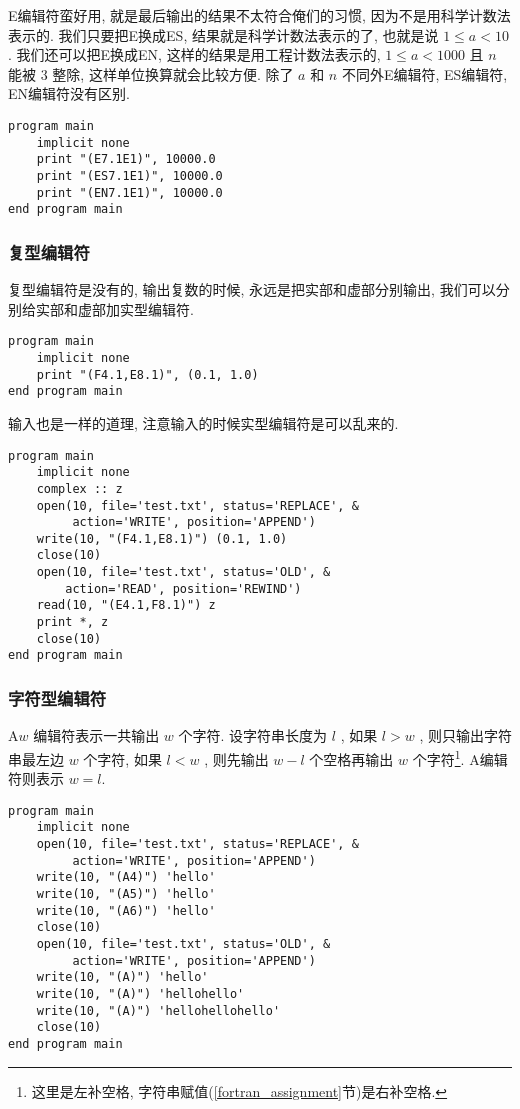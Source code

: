 E编辑符蛮好用, 就是最后输出的结果不太符合俺们的习惯, 因为不是用科学计数法表示的. 我们只要把E换成ES, 结果就是科学计数法表示的了, 也就是说 $ 1\leqslant a<10 $. 我们还可以把E换成EN, 这样的结果是用工程计数法表示的, $ 1\leqslant a<1000 $ 且 $ n $ 能被 $ 3 $ 整除, 这样单位换算就会比较方便. 除了 $ a $ 和 $ n $ 不同外E编辑符, ES编辑符, EN编辑符没有区别. 
\begin{lstlisting}
program main
    implicit none
    print "(E7.1E1)", 10000.0
    print "(ES7.1E1)", 10000.0
    print "(EN7.1E1)", 10000.0
end program main
\end{lstlisting}

\subsubsection{复型编辑符}

复型编辑符是没有的, 输出复数的时候, 永远是把实部和虚部分别输出, 我们可以分别给实部和虚部加实型编辑符. 
\begin{lstlisting}
program main
    implicit none
    print "(F4.1,E8.1)", (0.1, 1.0)
end program main
\end{lstlisting}
输入也是一样的道理, 注意输入的时候实型编辑符是可以乱来的. 
\begin{lstlisting}
program main
    implicit none
    complex :: z
    open(10, file='test.txt', status='REPLACE', &
         action='WRITE', position='APPEND')
    write(10, "(F4.1,E8.1)") (0.1, 1.0)
    close(10)
    open(10, file='test.txt', status='OLD', &
        action='READ', position='REWIND')
    read(10, "(E4.1,F8.1)") z
    print *, z
    close(10)
end program main
\end{lstlisting}

\subsubsection{字符型编辑符}

A$ w $ 编辑符表示一共输出 $ w $ 个字符. 设字符串长度为 $ l $ , 如果 $ l>w $ , 则只输出字符串最左边 $ w $ 个字符, 如果 $ l<w $ , 则先输出 $ w-l $ 个空格再输出 $ w $ 个字符\footnote{这里是左补空格, 字符串赋值(\ref{fortran_assignment}节)是右补空格.}. A编辑符则表示 $ w=l $. 
\begin{lstlisting}
program main
    implicit none
    open(10, file='test.txt', status='REPLACE', &
         action='WRITE', position='APPEND')
    write(10, "(A4)") 'hello'
    write(10, "(A5)") 'hello'
    write(10, "(A6)") 'hello'
    close(10)
    open(10, file='test.txt', status='OLD', &
         action='WRITE', position='APPEND')
    write(10, "(A)") 'hello'
    write(10, "(A)") 'hellohello'
    write(10, "(A)") 'hellohellohello'
    close(10)
end program main
\end{lstlisting}

